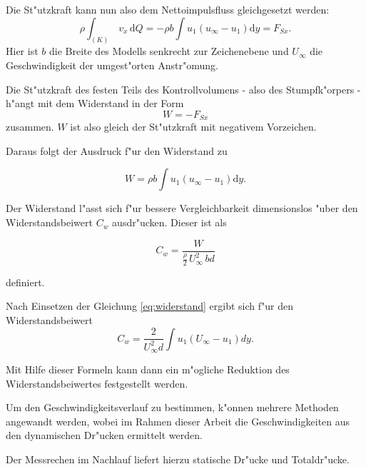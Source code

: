 Die St"utzkraft kann nun also dem Nettoimpulsfluss gleichgesetzt werden:
\begin{equation}
	\label{eq:nettoimpulsfluss}
	\rho \int_{(K)} \, v_x \, \mathrm{d}Q	= -\rho b \int u_1(u_{\infty} - u_1) \mathrm{d}y = F_{Sx}.	
\end{equation}
Hier ist $b$ die Breite des Modells senkrecht zur Zeichenebene und $U_{\infty}$ die Geschwindigkeit der umgest"orten Anstr"omung.

Die St"utzkraft des festen Teils des Kontrollvolumens - also des Stumpfk"orpers - h"angt mit dem Widerstand in der Form
\begin{equation}
	\label{eq:W=-F_Sx}
	W = - F_{Sx}
\end{equation}
zusammen. 
$W$ ist also gleich der St"utzkraft mit negativem Vorzeichen.

Daraus folgt der Ausdruck f"ur den Widerstand zu
\begin{center}
	\begin{equation}
		\label{eq:widerstand}
		W = \rho b \int u_{1} (u_{\infty}- u_{1}) \mathrm{d}y.
	\end{equation}
\end{center}

Der Widerstand l"asst sich f"ur bessere Vergleichbarkeit dimensionslos "uber den Widerstandsbeiwert $C_w$ ausdr"ucken. Dieser ist als 
\begin{center}
	\begin{equation}
		\label{eq:def-c_w}
		C_w = \frac{W}{\frac{\rho}{2}\, U_{\infty}^2 \, bd}
	\end{equation}
\end{center}
definiert.

Nach Einsetzen der Gleichung \ref{eq:widerstand} ergibt sich f"ur den Widerstandsbeiwert
\begin{equation}
	\label{eq:Bestimmungsgleichung C_w}
	C_w = \frac{2}{U_{\infty}^2 d} \int u_{1}(U_{\infty} - u_{1}) dy.
\end{equation}

Mit Hilfe dieser Formeln kann dann ein m"ogliche Reduktion des Widerstandsbeiwertes festgestellt werden.

Um den Geschwindigkeitsverlauf zu bestimmen, k"onnen mehrere Methoden angewandt werden, wobei im Rahmen dieser Arbeit die Geschwindigkeiten aus den dynamischen Dr"ucken ermittelt werden.

Der Messrechen im Nachlauf liefert hierzu statische Dr"ucke und Totaldr"ucke.


